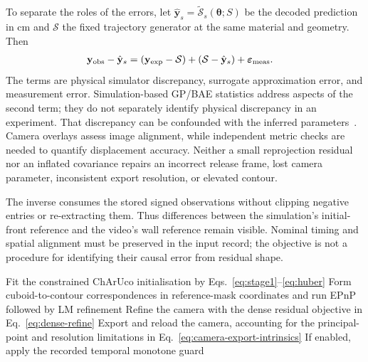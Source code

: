 To separate the roles of the errors, let $\hat{\mathbf y}_s
=\tilde{\mathcal S}_s(\boldsymbol\theta;S)$ be the decoded prediction
in cm and $\mathcal S$ the fixed trajectory generator at
the same material and geometry. Then
\begin{equation}
\label{eq:observation-model-gap}
\begin{aligned}
 \mathbf y_{\rm obs}-\hat{\mathbf y}_s
 ={}&(\mathbf y_{\rm exp}-\mathcal S)
     +(\mathcal S-\hat{\mathbf y}_s)
     +\boldsymbol\varepsilon_{\rm meas}.
\end{aligned}
\end{equation}
The terms are physical simulator discrepancy, surrogate approximation
error, and measurement error. Simulation-based GP/BAE statistics address
aspects of the second term; they do not separately identify physical
discrepancy in an experiment. That discrepancy can be confounded with
the inferred parameters~\cite{kennedy2001bayesian,brynjarsdottir2014discrepancy}.
Camera overlays assess image alignment, while independent metric checks
are needed to quantify displacement accuracy. Neither a small
reprojection residual nor an inflated covariance repairs an incorrect
release frame, lost camera parameter, inconsistent export resolution,
or elevated contour.

The inverse consumes the stored signed observations without clipping
negative entries or re-extracting them. Thus differences between the
simulation's initial-front reference and the video's wall reference
remain visible. Nominal timing and spatial alignment must be preserved
in the input record; the objective is not a procedure for identifying
their causal error from residual shape.

\begin{algorithm}[!htbp]
\caption{Camera calibration and metric observation extraction.}
\label{alg:calib}
Fit the constrained ChArUco initialisation by
Eqs.~\eqref{eq:stage1}--\eqref{eq:huber}\;
Form cuboid-to-contour correspondences in reference-mask coordinates
and run EPnP followed by LM refinement\;
Refine the camera with the dense residual objective in
Eq.~\eqref{eq:dense-refine}\;
Export and reload the camera, accounting for the principal-point and
resolution limitations in Eq.~\eqref{eq:camera-export-intrinsics}\;
If enabled, apply the recorded temporal monotone guard\;
\end{algorithm}

